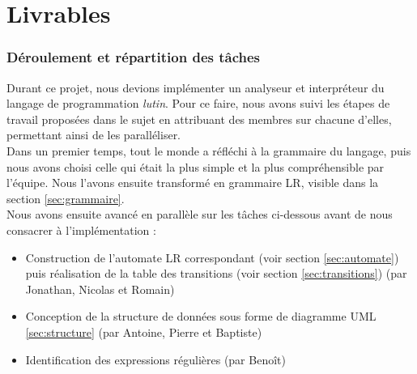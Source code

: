 





\tableofcontents

\listoffigures

\listoftables

\newpage

\part{Livrables}

\section{Déroulement et répartition des tâches}

Durant ce projet, nous devions implémenter un analyseur et interpréteur du langage de programmation \textit{lutin}. Pour ce faire, nous avons suivi les étapes de travail proposées dans le sujet en attribuant des membres sur chacune d'elles, permettant ainsi de les paralléliser. \\

Dans un premier temps, tout le monde a réfléchi à la grammaire du langage, puis nous avons choisi celle qui était la plus simple et la plus compréhensible par l'équipe. Nous l'avons ensuite transformé en grammaire LR, visible dans la section \ref{sec:grammaire}. \\

Nous avons ensuite avancé en parallèle sur les tâches ci-dessous avant de nous consacrer à l'implémentation :
\begin{itemize}
	\item Construction de l'automate LR correspondant (voir section \ref{sec:automate}) puis réalisation de la table des transitions (voir section \ref{sec:transitions}) (par Jonathan, Nicolas et Romain)
	\item Conception de la structure de données sous forme de diagramme UML \ref{sec:structure} (par Antoine, Pierre et Baptiste)
	\item Identification des expressions régulières (par Benoît) \\
\end{itemize}

